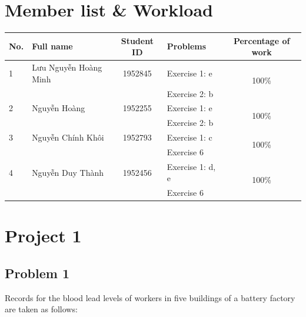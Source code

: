 \documentclass[a4paper]{article}
\numberwithin{equation}{section}
\begin{document}

\newpage
\tableofcontents
\newpage


\section*{Member list \& Workload}
\begin{center}
  \begin{tabular}{llclc}
    \toprule
    \textbf{No.} & \textbf{Full name}    & \textbf{Student ID} & \textbf{Problems} & \textbf{Percentage of work} \\
    \midrule
    1            & Lưu Nguyễn Hoàng Minh & 1952845             & Exercise 1: e     & \multirow{2}{*}{100\%}      \\
                 &                       &                     & Exercise 2: b     &                             \\
    \midrule
    2            & Nguyễn Hoàng          & 1952255             & Exercise 1: e     & \multirow{2}{*}{100\%}      \\
                 &                       &                     & Exercise 2: b     &                             \\
    \midrule
    3            & Nguyễn Chính Khôi     & 1952793             & Exercise 1: c     & \multirow{2}{*}{100\%}      \\
                 &                       &                     & Exercise 6        &                             \\
    \midrule
    4            & Nguyễn Duy Thành      & 1952456             & Exercise 1: d, e  & \multirow{2}{*}{100\%}      \\
                 &                       &                     & Exercise 6        &                             \\
    \bottomrule
  \end{tabular}
\end{center}


\newpage
\section{Project 1}
\subsection{Problem 1}

Records for the blood lead levels of workers in five buildings of a battery factory are taken as follows:
\end{document}
